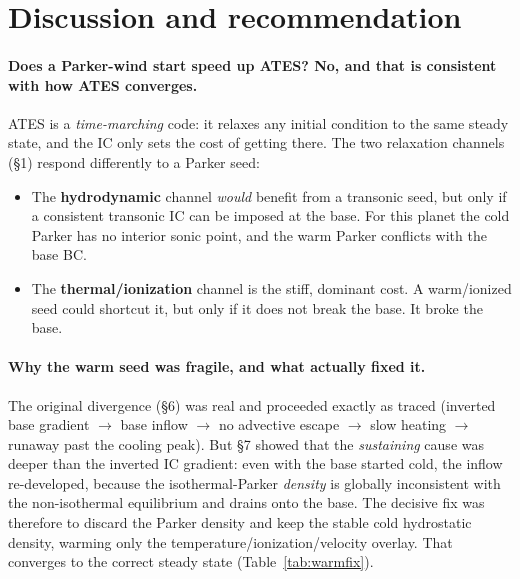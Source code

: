 \documentclass[english,a4paper]{my_memo}
\begin{document}
\section{Discussion and recommendation}\label{sec:reco}
\paragraph{Does a Parker-wind start speed up ATES? No, and that is consistent with
how ATES converges.} ATES is a \emph{time-marching} code: it relaxes any initial
condition to the same steady state, and the IC only sets the cost of getting there. The
two relaxation channels (\S1) respond differently to a Parker seed:
\begin{itemize}\itemsep2pt
\item The \textbf{hydrodynamic} channel \emph{would} benefit from a transonic seed, but
  only if a consistent transonic IC can be imposed at the base. For this planet the cold
  Parker has no interior sonic point, and the warm Parker conflicts with the base BC.
\item The \textbf{thermal/ionization} channel is the stiff, dominant cost. A warm/ionized
  seed could shortcut it, but only if it does not break the base. It broke the base.
\end{itemize}

\paragraph{Why the warm seed was fragile, and what actually fixed it.} The original
divergence (\S6) was real and proceeded exactly as traced (inverted base gradient $\to$ base
inflow $\to$ no advective escape $\to$ slow heating $\to$ runaway past the cooling peak). But
\S7 showed that the \emph{sustaining} cause was deeper than the inverted IC gradient: even with
the base started cold, the inflow re-developed, because the isothermal-Parker \emph{density} is
globally inconsistent with the non-isothermal equilibrium and drains onto the base. The
decisive fix was therefore to discard the Parker density and keep the stable cold hydrostatic
density, warming only the temperature/ionization/velocity overlay. That converges to the
correct steady state (Table~\ref{tab:warmfix}).
\end{document}
